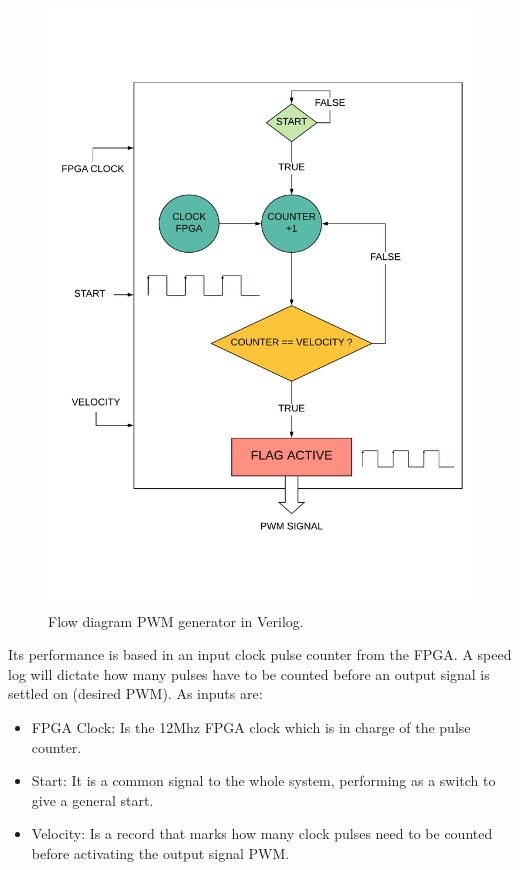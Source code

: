 \begin{figure}[H]
	\center
	\includegraphics[trim = 0mm 0mm 0mm 0mm, clip,scale=0.4]{imagenes/Balancing_robot/pwm_control.pdf}
	\caption{Flow diagram PWM generator in Verilog.}
	\label{fig:pwm_control}
\end{figure}

Its performance is based in an input clock pulse counter from the FPGA. A speed log will dictate how many pulses have to be counted before an output signal is settled on (desired PWM). As inputs are: \newline 
\begin{itemize}
	\item FPGA Clock: Is the 12Mhz FPGA clock which is in charge of the pulse counter.
	\item Start: It is a common signal to the whole system, performing as a switch to give a general start.
	\item Velocity: Is a record that marks how many clock pulses need to be counted before activating the output signal PWM.
\end{itemize}

